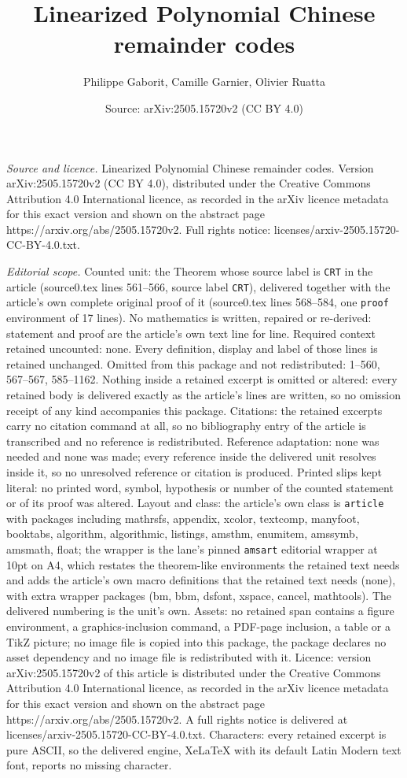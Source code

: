 \documentclass[10pt,a4paper]{amsart}
\title[Linearized Polynomial Chinese remainder codes]{Linearized Polynomial Chinese remainder codes}
\author{Philippe Gaborit, Camille Garnier, Olivier Ruatta}
\date{Source: arXiv:2505.15720v2 (CC BY 4.0)}
\begin{document}
\maketitle

\noindent\emph{Source and licence.} Linearized Polynomial Chinese remainder codes. Version arXiv:2505.15720v2 (CC BY 4.0), distributed under the Creative Commons Attribution 4.0 International licence, as recorded in the arXiv licence metadata for this exact version and shown on the abstract page https://arxiv.org/abs/2505.15720v2. Full rights notice: licenses/arxiv-2505.15720-CC-BY-4.0.txt.\par\smallskip

\noindent\textit{Editorial scope.} Counted unit: the Theorem whose source label is \texttt{CRT} in the article (source0.tex lines 561--566, source label \texttt{CRT}), delivered together with the article's own complete original proof of it (source0.tex lines 568--584, one \texttt{proof} environment of 17 lines). No mathematics is written, repaired or re-derived: statement and proof are the article's own text line for line. Required context retained uncounted: none. Every definition, display and label of those lines is retained unchanged. Omitted from this package and not redistributed: 1--560, 567--567, 585--1162. Nothing inside a retained excerpt is omitted or altered: every retained body is delivered exactly as the article's lines are written, so no omission receipt of any kind accompanies this package. Citations: the retained excerpts carry no citation command at all, so no bibliography entry of the article is transcribed and no reference is redistributed. Reference adaptation: none was needed and none was made; every reference inside the delivered unit resolves inside it, so no unresolved reference or citation is produced. Printed slips kept literal: no printed word, symbol, hypothesis or number of the counted statement or of its proof was altered. Layout and class: the article's own class is \texttt{article} with packages including mathrsfs, appendix, xcolor, textcomp, manyfoot, booktabs, algorithm, algorithmic, listings, amsthm, enumitem, amssymb, amsmath, float; the wrapper is the lane's pinned \texttt{amsart} editorial wrapper at 10pt on A4, which restates the theorem-like environments the retained text needs and adds the article's own macro definitions that the retained text needs (none), with extra wrapper packages (bm, bbm, dsfont, xspace, cancel, mathtools). The delivered numbering is the unit's own. Assets: no retained span contains a figure environment, a graphics-inclusion command, a PDF-page inclusion, a table or a TikZ picture; no image file is copied into this package, the package declares no asset dependency and no image file is redistributed with it. Licence: version arXiv:2505.15720v2 of this article is distributed under the Creative Commons Attribution 4.0 International licence, as recorded in the arXiv licence metadata for this exact version and shown on the abstract page https://arxiv.org/abs/2505.15720v2. A full rights notice is delivered at licenses/arxiv-2505.15720-CC-BY-4.0.txt. Characters: every retained excerpt is pure ASCII, so the delivered engine, XeLaTeX with its default Latin Modern text font, reports no missing character.
\end{document}
